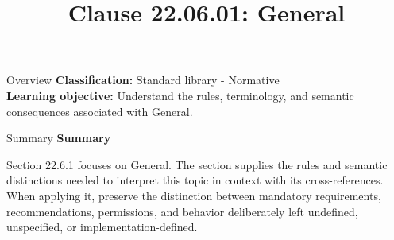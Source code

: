 \documentclass[10pt,letterpaper]{article}
\title{Clause 22.06.01: General}
\author{}
\date{}
\begin{document}
\maketitle
\begin{CornellOverviewBox}{Overview}
\textbf{Classification:} Standard library - Normative\\[2pt]
\textbf{Learning objective:} Understand the rules, terminology, and semantic consequences associated with General.
\end{CornellOverviewBox}\begin{CornellSummaryBox}{Summary}
{\sffamily\bfseries\color{Accent} Summary}\par\vspace{3pt}Section 22.6.1 focuses on General. The section supplies the rules and semantic distinctions needed to interpret this topic in context with its cross-references. When applying it, preserve the distinction between mandatory requirements, recommendations, permissions, and behavior deliberately left undefined, unspecified, or implementation-defined.
\end{CornellSummaryBox}
\end{document}
